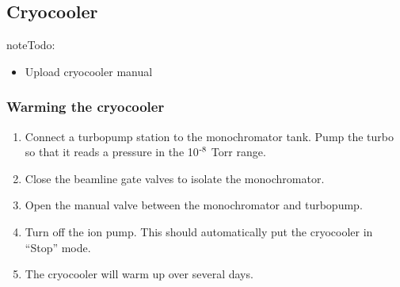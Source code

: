 \documentclass[letterpaper,10pt,english]{sphinxmanual}
\begin{document}
\subsection{Cryocooler}
\label{\detokenize{staff:cryocooler}}
\sphinxAtStartPar
{}

\begin{sphinxadmonition}{note}{\label{\detokenize{staff:id4}}Todo:}\begin{itemize}
\item {} 
\sphinxAtStartPar
Upload cryocooler manual

\end{itemize}
\end{sphinxadmonition}


\subsubsection{Warming the cryocooler}
\label{\detokenize{staff:warming-the-cryocooler}}\begin{enumerate}
%
\item {} 
\sphinxAtStartPar
Connect a turbo\sphinxhyphen{}pump station to the monochromator tank. Pump the turbo so that it reads a pressure in the 10$^{\text{\sphinxhyphen{}8}}$ Torr range.

\item {} 
\sphinxAtStartPar
Close the beamline gate valves to isolate the monochromator.

\item {} 
\sphinxAtStartPar
Open the manual valve between the monochromator and turbo\sphinxhyphen{}pump.

\item {} 
\sphinxAtStartPar
Turn off the ion pump. This should automatically put the cryocooler in “Stop” mode.

\item {} 
\sphinxAtStartPar
The cryocooler will warm up over several days.

\end{enumerate}
\end{document}
